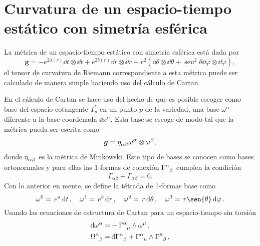 \chapter{Curvatura de un espacio-tiempo estático con simetría esférica}\label{curvature}

La métrica de un espacio-tiempo estático con simetría esférica está dada por
\begin{equation}
    \bm{g}=-e^{2 a(r)} \dd{t} \otimes \dd{t}+e^{2 b(r)} \dd{r} \otimes \dd{r} +r^{2}\left(\dd{\theta} \otimes \dd{\theta}+\operatorname{sen}^{2} \theta \dd{\varphi} \otimes \dd{\varphi}\right),
\end{equation}
el tensor de curvatura de Riemann correspondiente a esta métrica puede ser calculado de manera simple haciendo uso del cálculo de Cartan. 

En el cálculo de Cartan se hace uso del hecho de que es posible escoger como base del espacio cotangente $T^{*}_p$ en un punto $p$ de la variedad, una base $\omega^{\alpha}$ diferente a la base coordenada $\dd{x^\alpha}$. Esta base se escoge de modo tal que la métrica pueda ser escrita como 
\begin{equation}
    \bm{g}=\tensor{\eta}{_\alpha_\beta} \omega^{\alpha} \otimes \omega^{\beta},
\end{equation}
donde $\tensor{\eta}{_\alpha_\beta}$ es la métrica de Minkowski. Este tipo de bases se conocen como bases ortonormales y para ellas las 1-formas de conexión $\tensor{\Gamma}{^\alpha_\beta}$ cumplen la condición
\begin{equation}
    \Gamma_{\alpha \beta}+\Gamma_{\alpha \beta}=0. \label{skew}
\end{equation}
Con lo anterior en mente, se define la tétrada de 1-formas base como
\begin{equation}
    \omega^0=\,e^{a}\dd{t}, \quad
    \omega^1=\,e^{b}\dd{r}, \quad
    \omega^2=\,r\dd{\theta}, \quad
    \omega^3=\,r\sen{\theta}\dd{\varphi}.
    \label{tetrada}
\end{equation}
Usando las ecuaciones de estructura de Cartan para un espacio-tiempo sin torsión
\begin{subequations}
\begin{align}
    \dd{\omega^\alpha} =& -\tensor{\Gamma}{^\alpha_ \mu} \wedge \omega^{\mu}\,, \label{1SE}\\
    \tensor{\Omega}{^\alpha_\beta} =& \dd{ \tensor{\Gamma}{^\alpha_\beta}} + \tensor{\Gamma}{^\alpha_\mu}  \wedge \tensor{\Gamma}{^\mu_\beta}\,, \label{2SE}
\end{align}
\end{subequations}
